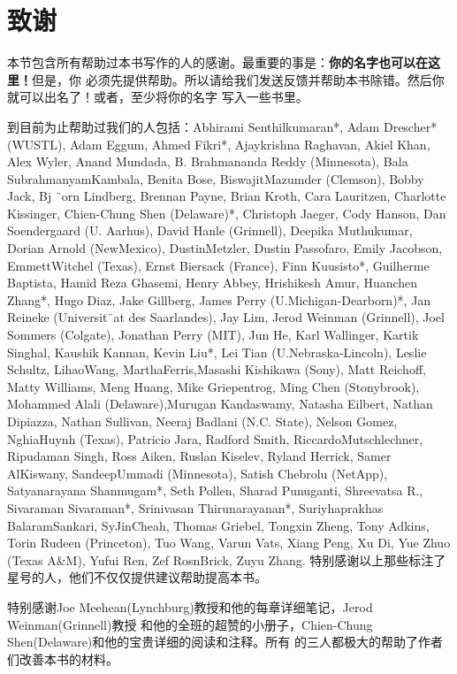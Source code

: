 {}
\section*{致谢}
本节包含所有帮助过本书写作的人的感谢。最重要的事是：\textbf{你的名字也可以在这里！}但是，你
必须先提供帮助。所以请给我们发送反馈并帮助本书除错。然后你就可以出名了！或者，至少将你的名字
写入一些书里。

到目前为止帮助过我们的人包括：Abhirami Senthilkumaran*, Adam Drescher* (WUSTL), 
Adam Eggum, Ahmed Fikri*, Ajaykrishna Raghavan, Akiel Khan, Alex Wyler, 
Anand Mundada, B. Brahmananda Reddy (Minnesota), Bala SubrahmanyamKambala, 
Benita Bose, BiswajitMazumder (Clemson), Bobby Jack, Bj ¨orn Lindberg, 
Brennan Payne, Brian Kroth, Cara Lauritzen, Charlotte Kissinger, 
Chien-Chung Shen (Delaware)*, Christoph Jaeger, Cody Hanson, 
Dan Soendergaard (U. Aarhus), David Hanle (Grinnell), Deepika Muthukumar, 
Dorian Arnold (NewMexico), DustinMetzler, Dustin Passofaro, Emily Jacobson, EmmettWitchel (Texas), Ernst Biersack (France), Finn Kuusisto*, 
Guilherme Baptista, Hamid Reza Ghasemi, Henry Abbey, Hrishikesh Amur, 
Huanchen Zhang*, Hugo Diaz, Jake Gillberg, James Perry (U.Michigan-Dearborn)*, 
Jan Reineke (Universit¨at des Saarlandes), Jay Lim, Jerod Weinman (Grinnell), 
Joel Sommers (Colgate), Jonathan Perry (MIT), Jun He, Karl Wallinger, 
Kartik Singhal, Kaushik Kannan, Kevin Liu*, Lei Tian (U.Nebraska-Lincoln), 
Leslie Schultz, LihaoWang, MarthaFerris,Masashi Kishikawa (Sony), Matt Reichoff, 
Matty Williams, Meng Huang, Mike Griepentrog, Ming Chen (Stonybrook), 
Mohammed Alali (Delaware),Murugan Kandaswamy, Natasha Eilbert,  Nathan Dipiazza, 
Nathan Sullivan, Neeraj Badlani (N.C. State), Nelson Gomez, NghiaHuynh (Texas), 
Patricio Jara, Radford Smith, RiccardoMutschlechner, Ripudaman Singh, Ross Aiken, Ruslan Kiselev, Ryland Herrick, Samer AlKiswany, SandeepUmmadi (Minnesota), 
Satish Chebrolu (NetApp), Satyanarayana Shanmugam*, Seth Pollen, Sharad Punuganti, 
Shreevatsa R., Sivaraman Sivaraman*, Srinivasan Thirunarayanan*, 
Suriyhaprakhas BalaramSankari, SyJinCheah, Thomas Griebel, Tongxin Zheng, 
Tony Adkins, Torin Rudeen (Princeton), Tuo Wang, Varun Vats, Xiang Peng, Xu Di, 
Yue Zhuo (Texas A\&M), Yufui Ren, Zef RosnBrick, Zuyu Zhang. 特别感谢以上那些标注了
星号的人，他们不仅仅提供建议帮助提高本书。

特别感谢Joe Meehean(Lynchburg)教授和他的每章详细笔记，Jerod Weinman(Grinnell)教授
和他的全班的超赞的小册子，Chien-Chung Shen(Delaware)和他的宝贵详细的阅读和注释。所有
的三人都极大的帮助了作者们改善本书的材料。

